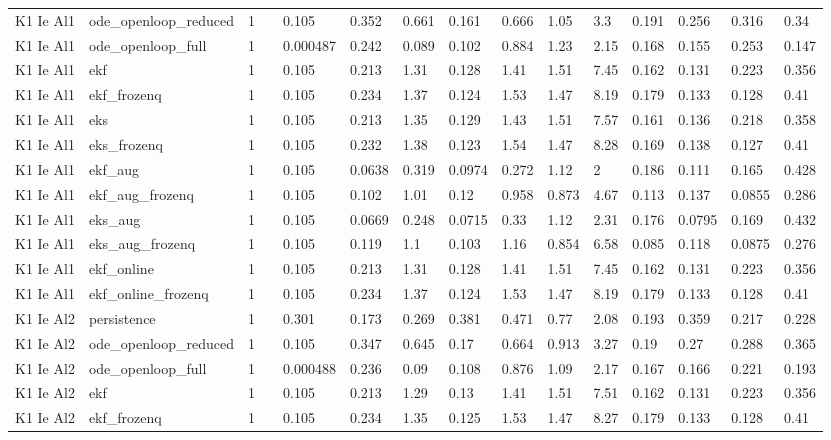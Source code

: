 \begin{table}[t]
\begin{tabular}{lllllllllllllll}
K1 Ie Al1 & ode\_openloop\_reduced & 1 &  & 0.105 & 0.352 & 0.661 & 0.161 & 0.666 & 1.05 & 3.3 & 0.191 & 0.256 & 0.316 & 0.34 \\
K1 Ie Al1 & ode\_openloop\_full & 1 &  & 0.000487 & 0.242 & 0.089 & 0.102 & 0.884 & 1.23 & 2.15 & 0.168 & 0.155 & 0.253 & 0.147 \\
K1 Ie Al1 & ekf & 1 &  & 0.105 & 0.213 & 1.31 & 0.128 & 1.41 & 1.51 & 7.45 & 0.162 & 0.131 & 0.223 & 0.356 \\
K1 Ie Al1 & ekf\_frozenq & 1 &  & 0.105 & 0.234 & 1.37 & 0.124 & 1.53 & 1.47 & 8.19 & 0.179 & 0.133 & 0.128 & 0.41 \\
K1 Ie Al1 & eks & 1 &  & 0.105 & 0.213 & 1.35 & 0.129 & 1.43 & 1.51 & 7.57 & 0.161 & 0.136 & 0.218 & 0.358 \\
K1 Ie Al1 & eks\_frozenq & 1 &  & 0.105 & 0.232 & 1.38 & 0.123 & 1.54 & 1.47 & 8.28 & 0.169 & 0.138 & 0.127 & 0.41 \\
K1 Ie Al1 & ekf\_aug & 1 &  & 0.105 & 0.0638 & 0.319 & 0.0974 & 0.272 & 1.12 & 2 & 0.186 & 0.111 & 0.165 & 0.428 \\
K1 Ie Al1 & ekf\_aug\_frozenq & 1 &  & 0.105 & 0.102 & 1.01 & 0.12 & 0.958 & 0.873 & 4.67 & 0.113 & 0.137 & 0.0855 & 0.286 \\
K1 Ie Al1 & eks\_aug & 1 &  & 0.105 & 0.0669 & 0.248 & 0.0715 & 0.33 & 1.12 & 2.31 & 0.176 & 0.0795 & 0.169 & 0.432 \\
K1 Ie Al1 & eks\_aug\_frozenq & 1 &  & 0.105 & 0.119 & 1.1 & 0.103 & 1.16 & 0.854 & 6.58 & 0.085 & 0.118 & 0.0875 & 0.276 \\
K1 Ie Al1 & ekf\_online & 1 &  & 0.105 & 0.213 & 1.31 & 0.128 & 1.41 & 1.51 & 7.45 & 0.162 & 0.131 & 0.223 & 0.356 \\
K1 Ie Al1 & ekf\_online\_frozenq & 1 &  & 0.105 & 0.234 & 1.37 & 0.124 & 1.53 & 1.47 & 8.19 & 0.179 & 0.133 & 0.128 & 0.41 \\
K1 Ie Al2 & persistence & 1 &  & 0.301 & 0.173 & 0.269 & 0.381 & 0.471 & 0.77 & 2.08 & 0.193 & 0.359 & 0.217 & 0.228 \\
K1 Ie Al2 & ode\_openloop\_reduced & 1 &  & 0.105 & 0.347 & 0.645 & 0.17 & 0.664 & 0.913 & 3.27 & 0.19 & 0.27 & 0.288 & 0.365 \\
K1 Ie Al2 & ode\_openloop\_full & 1 &  & 0.000488 & 0.236 & 0.09 & 0.108 & 0.876 & 1.09 & 2.17 & 0.167 & 0.166 & 0.221 & 0.193 \\
K1 Ie Al2 & ekf & 1 &  & 0.105 & 0.213 & 1.29 & 0.13 & 1.41 & 1.51 & 7.51 & 0.162 & 0.131 & 0.223 & 0.356 \\
K1 Ie Al2 & ekf\_frozenq & 1 &  & 0.105 & 0.234 & 1.35 & 0.125 & 1.53 & 1.47 & 8.27 & 0.179 & 0.133 & 0.128 & 0.41 \\

\end{tabular}
\end{table}

